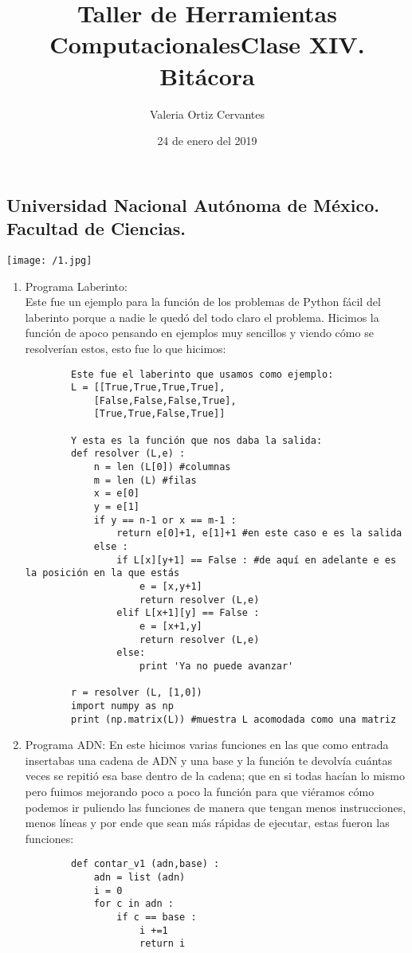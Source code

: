 \documentclass{article} %
\title{\Huge Taller de Herramientas Computacionales}
\author{\huge Valeria Ortiz Cervantes}
\date{\LARGE 24 de enero del 2019}
\begin{document}
\maketitle
\begin{center}
	\subsection*{\LARGE Universidad Nacional Autónoma de México.\\Facultad de Ciencias.\\}
	\texttt{[image: /1.jpg]}
\end{center}
\newpage
\title{\LARGE Clase XIV. Bitácora\\}
\begin{enumerate}
	\item Programa Laberinto:\\Este fue un ejemplo para la función de los problemas de Python fácil del laberinto porque a nadie le quedó del todo claro el problema. Hicimos la función de apoco pensando en ejemplos muy sencillos y viendo cómo se resolverían estos, esto fue lo que hicimos:
	\begin{verbatim}
		Este fue el laberinto que usamos como ejemplo:
		L = [[True,True,True,True],
			[False,False,False,True],
			[True,True,False,True]]
			
		Y esta es la función que nos daba la salida: 
		def resolver (L,e) :
		    n = len (L[0]) #columnas
		    m = len (L) #filas
		    x = e[0]
		    y = e[1]
	 	    if y == n-1 or x == m-1 :
		        return e[0]+1, e[1]+1 #en este caso e es la salida
		    else :
		        if L[x][y+1] == False : #de aquí en adelante e es la posición en la que estás
		            e = [x,y+1]
		            return resolver (L,e)
	            elif L[x+1][y] == False :
		            e = [x+1,y] 
		            return resolver (L,e)
		        else:
		            print 'Ya no puede avanzar'
		
		r = resolver (L, [1,0]) 
		import numpy as np
		print (np.matrix(L)) #muestra L acomodada como una matriz
	\end{verbatim}
	\item Programa ADN: En este hicimos varias funciones en las que como entrada insertabas una cadena de ADN y una base y la función te devolvía cuántas veces se repitió esa base dentro de la cadena; que en si todas hacían lo mismo pero fuimos mejorando poco a poco la función para que viéramos cómo podemos ir puliendo las funciones de manera que tengan menos instrucciones, menos líneas y por ende que sean más rápidas de ejecutar, estas fueron las funciones:
	\begin{verbatim}
		def contar_v1 (adn,base) :
		    adn = list (adn)
		    i = 0
		    for c in adn :
		        if c == base :
		            i +=1
		            return i
		 

\end{verbatim}
\end{enumerate}
\end{document}

